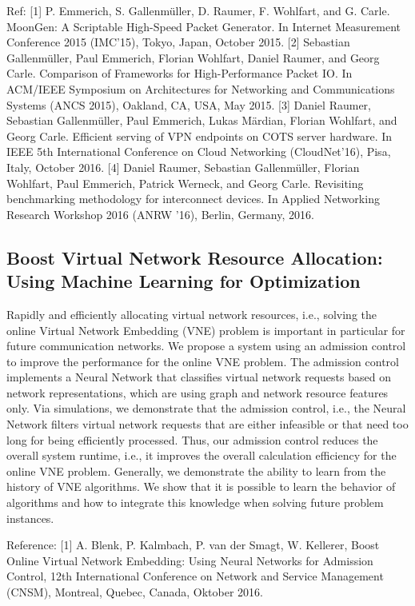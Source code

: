 Ref: [1] P. Emmerich, S. Gallenmüller, D. Raumer, F. Wohlfart, and G. Carle.
MoonGen: A Scriptable High-Speed Packet Generator. In Internet
Measurement Conference 2015 (IMC’15), Tokyo,
Japan, October 2015.
[2] Sebastian Gallenmüller, Paul Emmerich, Florian Wohlfart, Daniel
Raumer, and Georg Carle. Comparison of Frameworks for High-Performance
Packet IO. In ACM/IEEE Symposium on
Architectures for Networking and Communications Systems (ANCS 2015),
Oakland, CA, USA, May 2015.
[3] Daniel Raumer, Sebastian Gallenmüller, Paul Emmerich, Lukas Märdian,
Florian Wohlfart, and Georg Carle. Efficient serving of VPN endpoints on
COTS server hardware. In IEEE 5th
International Conference on Cloud Networking (CloudNet’16), Pisa, Italy,
October 2016.
[4] Daniel Raumer, Sebastian Gallenmüller, Florian Wohlfart, Paul
Emmerich, Patrick Werneck, and Georg Carle. Revisiting benchmarking
methodology for interconnect devices. In Applied
Networking Research Workshop 2016 (ANRW ’16), Berlin, Germany, 2016.


\subsection{Boost Virtual Network Resource Allocation: Using Machine Learning for Optimization}

Rapidly and efficiently allocating virtual network resources, i.e., 
solving the online Virtual Network Embedding (VNE) problem is 
important in particular for future communication networks. We 
propose a system using an admission control to improve the performance 
for the online VNE problem. The admission control implements a Neural 
Network that classifies virtual network requests based on network 
representations, which are using graph and network resource features 
only. Via simulations, we demonstrate that the admission control, 
i.e., the Neural Network filters virtual network requests that are 
either infeasible or that need too long for being efficiently 
processed. Thus, our admission control reduces the overall system 
runtime, i.e., it improves the overall calculation efficiency for 
the online VNE problem.
Generally, we demonstrate the ability to learn from the history 
of VNE algorithms. We show that it is possible to learn the behavior 
of algorithms and how to integrate this knowledge when solving future 
problem instances.

Reference:
[1] A. Blenk, P. Kalmbach, P. van der Smagt, W. Kellerer, Boost Online 
Virtual Network Embedding: Using Neural Networks for Admission Control,  
12th International Conference on Network and Service Management (CNSM),
 Montreal, Quebec, Canada, Oktober 2016.

